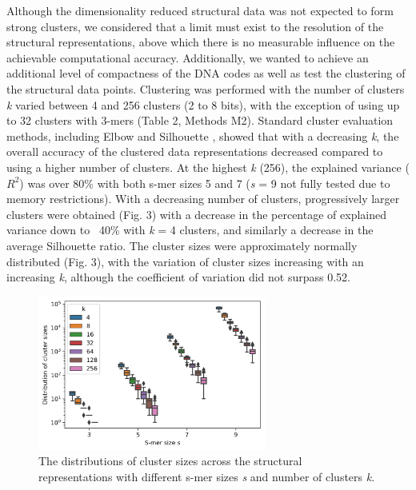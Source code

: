 \documentclass[10pt]{article}
\begin{document}
Although the dimensionality reduced structural data was not expected to form strong clusters, we considered that a limit must exist to the resolution of the structural representations, above which there is no measurable influence on the achievable computational accuracy. Additionally, we wanted to achieve an additional level of compactness of the DNA codes as well as test the clustering of the structural data points. Clustering was performed with the number of clusters \textit{k} varied between 4 and 256 clusters (2 to 8 bits), with the exception of using up to 32 clusters with 3-mers (Table 2, Methods M2). Standard cluster evaluation methods, including Elbow and Silhouette \cite{Rousseeuw1987-mx}, showed that with a decreasing \textit{k}, the overall accuracy of the clustered data representations decreased compared to using a higher number of clusters. At the highest \textit{k} (256), the explained variance ($R^2$) was over 80\% with both s-mer sizes 5 and 7 (\textit{s} = 9 not fully tested due to memory restrictions). With a decreasing number of clusters, progressively larger clusters were obtained (Fig. 3) with a decrease in the percentage of explained variance down to ~40\% with \textit{k} = 4 clusters, and similarly a decrease in the average Silhouette ratio. The cluster sizes were approximately normally distributed (Fig. 3), with the variation of cluster sizes increasing with an increasing \textit{k},  although the coefficient of variation did not surpass 0.52.

\begin{figure}[ht]
  \centering
  \includegraphics[width=7.5cm,keepaspectratio]{smer_fig_cluster_distribution.png}
  \caption{The distributions of cluster sizes across the structural representations with different s-mer sizes \textit{s} and number of clusters \textit{k}.}
\end{figure}
\end{document}
